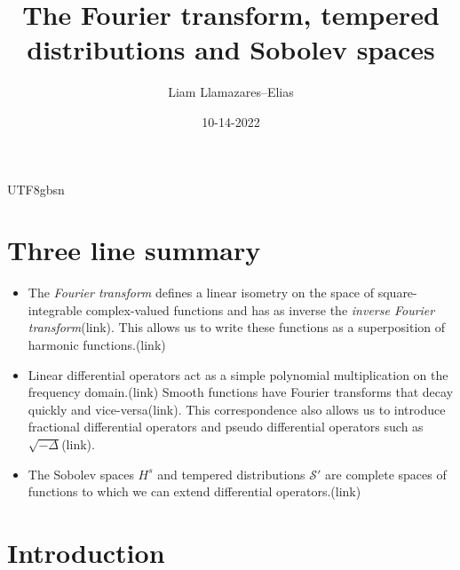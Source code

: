 \documentclass[
]{article}
\title{The Fourier transform, tempered distributions and Sobolev spaces}
\author{Liam Llamazares--Elias}
\date{10-14-2022}
\begin{document}
\maketitle

{UTF8}{gbsn}

\hypertarget{three-line-summary}{%
	\section*{\texorpdfstring{ Three line summary
	  }{ Three line summary }}\label{three-line-summary}}

\begin{itemize}
	\item
	      The \emph{Fourier transform} defines a linear isometry on the space of
	      square-integrable complex-valued functions and has as inverse the
	      \emph{inverse Fourier transform}(link). This allows us to write these
	      functions as a superposition of harmonic functions.(link)
	\item
	      Linear differential operators act as a simple polynomial
	      multiplication on the frequency domain.(link) Smooth functions have
	      Fourier transforms that decay quickly and vice-versa(link). This
	      correspondence also allows us to introduce fractional differential
	      operators and pseudo differential operators such as
	      \(\sqrt{-\Delta }\)(link).
	\item
	      The Sobolev spaces \(H^s\) and tempered distributions
	      \({\mathcal S}'\) are complete spaces of functions to which we can
	      extend differential operators.(link)
\end{itemize}

\hypertarget{introduction}{%
	\section*{Introduction}\label{introduction}}
\end{document}

